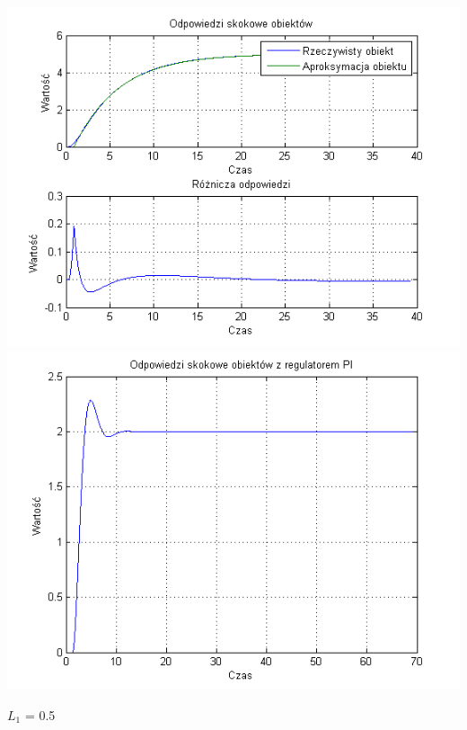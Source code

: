 \documentclass[10pt,a4paper]{article}
\begin{document}
\begin{center}
\includegraphics[scale=1]{images/jeden/skrypt_197.png}\\
\includegraphics[scale=1]{images/jeden/skrypt_198.png}\\
\end{center}
\newpage
$L_1$ = 0.5
\end{document}
